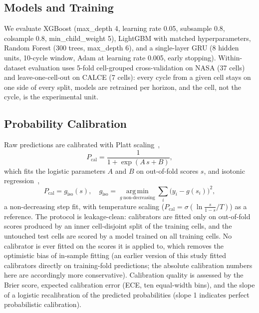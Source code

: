 \documentclass[conference]{IEEEtran}
\begin{document}
\subsection{Models and Training}
We evaluate XGBoost (max\_depth 4, learning rate 0.05, subsample 0.8,
colsample 0.8, min\_child\_weight 5), LightGBM with matched
hyperparameters, Random Forest (300 trees, max\_depth 6), and a
single-layer GRU (8 hidden units, 10-cycle window, Adam at learning
rate 0.005, early stopping). Within-dataset evaluation uses 5-fold
cell-grouped cross-validation on NASA (37 cells) and
leave-one-cell-out on CALCE (7 cells): every cycle from a given cell
stays on one side of every split, models are retrained per horizon,
and the cell, not the cycle, is the experimental unit.

\subsection{Probability Calibration}
Raw predictions are calibrated with Platt scaling~\cite{platt1999},
\begin{equation}
P_{\mathrm{cal}} = \frac{1}{1 + \exp(A\,s + B)},
\label{eq:platt}
\end{equation}
which fits the logistic parameters $A$ and $B$ on out-of-fold scores
$s$, and isotonic regression~\cite{zadrozny2002},
\begin{equation}
P_{\mathrm{cal}} = g_{\mathrm{iso}}(s), \quad
g_{\mathrm{iso}} = \operatorname*{arg\,min}_{g\;\mathrm{non\mbox{-}decreasing}}
\textstyle\sum_i \bigl(y_i - g(s_i)\bigr)^2,
\label{eq:iso}
\end{equation}
a non-decreasing step fit, with temperature scaling ($P_{\mathrm{cal}}
= \sigma\!\left(\ln\tfrac{s}{1-s}\big/T\right)$) as a reference. The protocol is leakage-clean: calibrators are fitted only on
out-of-fold scores produced by an inner cell-disjoint split of the
training cells, and the untouched test cells are scored by a model
trained on all training cells. No calibrator is ever fitted on the
scores it is applied to, which removes the optimistic bias of in-sample
fitting (an earlier version of this study fitted calibrators directly
on training-fold predictions; the absolute calibration numbers here are
accordingly more conservative). Calibration quality
is assessed by the Brier score, expected calibration error (ECE, ten
equal-width bins), and the slope of a logistic recalibration of the
predicted probabilities (slope 1 indicates perfect probabilistic
calibration).
\end{document}
